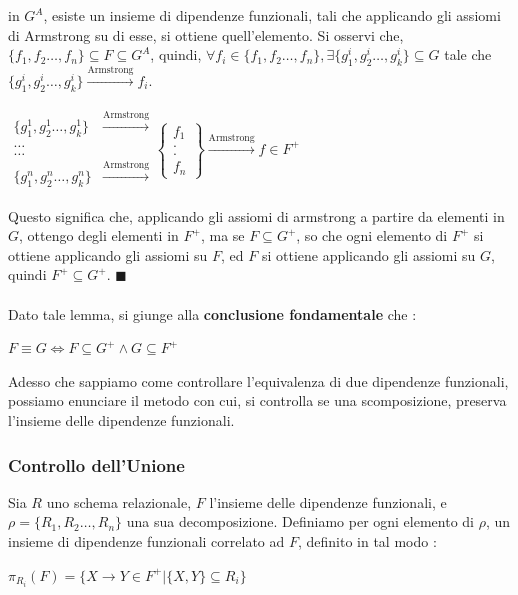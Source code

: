 \documentclass[12pt, letterpaper]{article}
\newcommand{\acc}{\\\hphantom{}\\}
\begin{document}
in \(G^A\), esiste un insieme di dipendenze funzionali, tali che applicando gli assiomi di Armstrong su di esse, si ottiene 
quell'elemento. Si osservi che, \(\{f_1,f_2\dots,f_n\}\subseteq F \subseteq G^A\), quindi, \(\forall f_i\in \{f_1,f_2\dots,f_n\}
, \exists \{g_1^i,g_2^i\dots,g_k^i\}\subseteq G \) tale che \( \{g_1^i,g_2^i\dots,g_k^i\}\xrightarrow[\text{}]{\text{Armstrong}}f_i\).
\begin{center}
    \(\begin{matrix}
        \{g_1^1,g_2^1\dots,g_k^1\}&\xrightarrow[\text{}]{\text{Armstrong}}\\\dots\\\dots\\
        \{g_1^n,g_2^n\dots,g_k^n\}&\xrightarrow[\text{}]{\text{Armstrong}}
    \end{matrix}\begin{Bmatrix}
        f_1\\.\\.\\f_n
        \end{Bmatrix}\xrightarrow[\text{}]{\text{Armstrong}}f\in F^+\)
\end{center}
Questo significa che, applicando gli assiomi di armstrong a partire da elementi in \(G\), ottengo degli elementi 
in \(F^+\), ma se \(F\subseteq G^+\), so che ogni elemento di \(F^+\) si ottiene applicando gli assiomi 
su \(F\), ed \(F\) si ottiene applicando gli assiomi su \(G\), quindi \(F^+\subseteq G^+\). \(\blacksquare\)\acc 
Dato tale lemma, si giunge alla \textbf{conclusione fondamentale} che : \begin{center}
    \(F\equiv G\iff F\subseteq G^+\land G\subseteq F^+\)
\end{center}
Adesso che sappiamo come controllare l'equivalenza di due dipendenze funzionali, possiamo enunciare il metodo con cui, si controlla 
se una scomposizione, preserva l'insieme delle dipendenze funzionali.\subsubsection{Controllo dell'Unione}\label{CheckUnion}
Sia \(R\) uno schema relazionale, \(F\) l'insieme delle dipendenze funzionali, e \(\rho=\{R_1,R_2\dots,R_n\}\) una sua decomposizione.
Definiamo per ogni elemento di \(\rho\), un insieme di dipendenze funzionali correlato ad \(F\), definito in tal modo : \begin{center}
    \(\pi_{R_i}(F)=\{X\rightarrow Y\in F^+|\{X,Y\}\subseteq R_i\}\)
\end{center}
\end{document}
